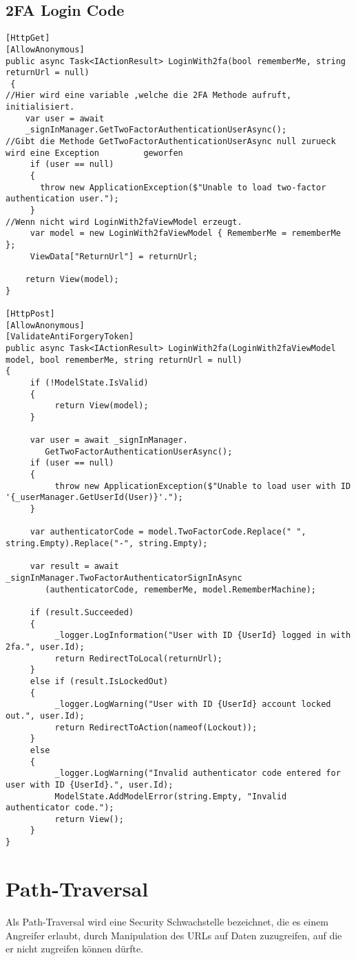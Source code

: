 \subsection{2FA Login Code}
\label{sec:2FALogin}
\begin{lstlisting}[caption={Login}]
[HttpGet]
[AllowAnonymous]
public async Task<IActionResult> LoginWith2fa(bool rememberMe, string returnUrl = null)
 {
//Hier wird eine variable ,welche die 2FA Methode aufruft, initialisiert.
    var user = await 
    _signInManager.GetTwoFactorAuthenticationUserAsync();
//Gibt die Methode GetTwoFactorAuthenticationUserAsync null zurueck wird eine Exception 	    geworfen
     if (user == null)
     {
       throw new ApplicationException($"Unable to load two-factor authentication user.");
     }
//Wenn nicht wird LoginWith2faViewModel erzeugt.
     var model = new LoginWith2faViewModel { RememberMe = rememberMe };
     ViewData["ReturnUrl"] = returnUrl;

    return View(model);
}

[HttpPost]
[AllowAnonymous]
[ValidateAntiForgeryToken]
public async Task<IActionResult> LoginWith2fa(LoginWith2faViewModel model, bool rememberMe, string returnUrl = null)
{
     if (!ModelState.IsValid)
     {
          return View(model);
     }

     var user = await _signInManager.
     	GetTwoFactorAuthenticationUserAsync();
     if (user == null)
     {
          throw new ApplicationException($"Unable to load user with ID '{_userManager.GetUserId(User)}'.");
     }

     var authenticatorCode = model.TwoFactorCode.Replace(" ", string.Empty).Replace("-", string.Empty);

     var result = await _signInManager.TwoFactorAuthenticatorSignInAsync
     	(authenticatorCode, rememberMe, model.RememberMachine);

     if (result.Succeeded)
     {
          _logger.LogInformation("User with ID {UserId} logged in with 2fa.", user.Id);
          return RedirectToLocal(returnUrl);
     }
     else if (result.IsLockedOut)
     {
          _logger.LogWarning("User with ID {UserId} account locked out.", user.Id);
          return RedirectToAction(nameof(Lockout));
     }
     else
     {
          _logger.LogWarning("Invalid authenticator code entered for user with ID {UserId}.", user.Id);
          ModelState.AddModelError(string.Empty, "Invalid authenticator code.");
          return View();
     }
}
\end{lstlisting}
\section{Path-Traversal}
\label{sec:Path-Traversal}
Als Path-Traversal wird eine Security Schwachstelle bezeichnet, die es einem Angreifer erlaubt, durch Manipulation des URLs auf Daten zuzugreifen, auf die er nicht zugreifen können dürfte. 
